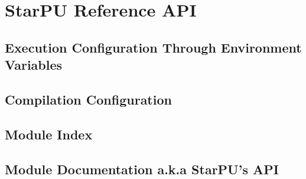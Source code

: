 \part{StarPU Reference API}

\chapter{Execution Configuration Through Environment Variables}
\label{ExecutionConfigurationThroughEnvironmentVariables}
\hypertarget{ExecutionConfigurationThroughEnvironmentVariables}{}


\chapter{Compilation Configuration}
\label{CompilationConfiguration}
\hypertarget{CompilationConfiguration}{}


\chapter{Module Index}


\chapter{Module Documentation a.k.a StarPU's API}
\label{ModuleDocumentation}
\hypertarget{ModuleDocumentation}{}










































